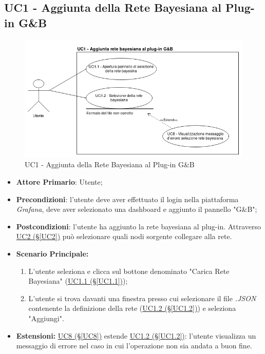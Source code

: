 \pagebreak
\subsection{UC1 - Aggiunta della Rete Bayesiana al Plug-in G\&B}\label{UC1}

\begin{figure}[H]
	\begin{center}
		\includegraphics[scale=0.5]{./images/UC1.png}
		 \caption{UC1 - Aggiunta della Rete Bayesiana al Plug-in G\&B}	
	\end{center}
\end{figure}
\begin{itemize}
	\item \textbf{Attore Primario}: Utente;
	\item \textbf{Precondizioni}: l'utente deve aver effettuato il login nella piattaforma \textit{Grafana}, deve aver selezionato una dashboard e aggiunto il pannello "G\&B";
	\item \textbf{Postcondizioni}: l'utente ha aggiunto la rete bayesiana al plug-in. Attraverso \hyperref[UC2]{UC2 (§\ref*{UC2})} può selezionare quali nodi sorgente collegare alla rete.
	\item \textbf{Scenario Principale:}
	\begin{enumerate}
		\item L'utente seleziona e clicca sul bottone denominato "Carica Rete Bayesiana" (\hyperref[UC1.1]{UC1.1 (§\ref*{UC1.1})});
		\item L'utente si trova davanti una finestra presso cui selezionare il file \textit{.JSON} contenente la definizione della rete (\hyperref[UC1.2]{UC1.2 (§\ref*{UC1.2})}) e seleziona "Aggiungi".
	\end{enumerate}
	\item \textbf{Estensioni:} \hyperref[UC8]{UC8 (§\ref*{UC8})} estende \hyperref[UC1.2]{UC1.2 (§\ref*{UC1.2})}: l'utente visualizza un messaggio di errore nel caso in cui l'operazione non sia andata a buon fine.
\end{itemize}

